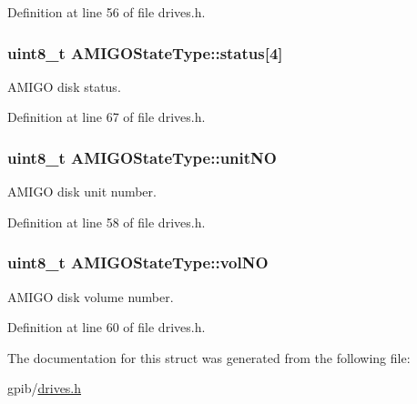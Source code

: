 Definition at line 56 of file drives.\+h.

\subsubsection[{\texorpdfstring{status}{status}}]{\setlength{\rightskip}{0pt plus 5cm}uint8\+\_\+t A\+M\+I\+G\+O\+State\+Type\+::status\mbox{[}4\mbox{]}}\hypertarget{structAMIGOStateType_a20ecb3cbbcb1fe4746c2d38edc125412}{}\label{structAMIGOStateType_a20ecb3cbbcb1fe4746c2d38edc125412}


A\+M\+I\+GO disk status. 



Definition at line 67 of file drives.\+h.

\subsubsection[{\texorpdfstring{unit\+NO}{unitNO}}]{\setlength{\rightskip}{0pt plus 5cm}uint8\+\_\+t A\+M\+I\+G\+O\+State\+Type\+::unit\+NO}\hypertarget{structAMIGOStateType_a3d0cc02f8822c817feddf93dd08a5034}{}\label{structAMIGOStateType_a3d0cc02f8822c817feddf93dd08a5034}


A\+M\+I\+GO disk unit number. 



Definition at line 58 of file drives.\+h.

\subsubsection[{\texorpdfstring{vol\+NO}{volNO}}]{\setlength{\rightskip}{0pt plus 5cm}uint8\+\_\+t A\+M\+I\+G\+O\+State\+Type\+::vol\+NO}\hypertarget{structAMIGOStateType_a9825e282ac5844225a43b7f0835da67f}{}\label{structAMIGOStateType_a9825e282ac5844225a43b7f0835da67f}


A\+M\+I\+GO disk volume number. 



Definition at line 60 of file drives.\+h.



The documentation for this struct was generated from the following file\+:\begin{DoxyCompactItemize}
\item 
gpib/\hyperlink{drives_8h}{drives.\+h}\end{DoxyCompactItemize}
